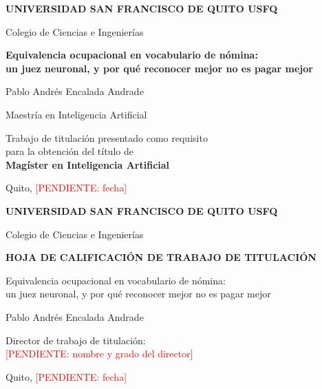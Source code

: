 \documentclass[12pt,a4paper,oneside]{report}
\newcommand{\pend}[1]{\textcolor{red}{\small[PENDIENTE: #1]}}
\newcommand{\elTitulo}{Equivalencia ocupacional en vocabulario de nómina:\\
  un juez neuronal, y por qué reconocer mejor no es pagar mejor}
\newcommand{\elAutor}{Pablo Andrés Encalada Andrade}
\newcommand{\elPrograma}{Maestría en Inteligencia Artificial}
\newcommand{\elColegio}{Colegio de Ciencias e Ingenierías}
\newcommand{\elDirector}{\pend{nombre y grado del director}}
\newcommand{\laFecha}{Quito, \pend{fecha}}
\begin{document}

\begin{titlepage}
\centering
{\large\bfseries UNIVERSIDAD SAN FRANCISCO DE QUITO USFQ\par}
\vspace{0.6cm}
{\large \elColegio\par}
\vspace{2.2cm}
{\LARGE\bfseries \elTitulo\par}
\vspace{2.2cm}
{\large \elAutor\par}
\vspace{0.6cm}
{\large \elPrograma\par}
\vfill
{Trabajo de titulación presentado como requisito\\
para la obtención del título de\\[0.4cm]
\textbf{Magíster en Inteligencia Artificial}\par}
\vspace{1.5cm}
{\laFecha\par}
\end{titlepage}

\thispagestyle{empty}
\begin{center}
{\large\bfseries UNIVERSIDAD SAN FRANCISCO DE QUITO USFQ\par}
\vspace{0.4cm}
{\large \elColegio\par}
\vspace{1.6cm}
{\large\bfseries HOJA DE CALIFICACIÓN DE TRABAJO DE TITULACIÓN\par}
\vspace{1.6cm}
{\large \elTitulo\par}
\vspace{1.6cm}
{\large \elAutor\par}
\vfill
\begin{flushleft}
Director de trabajo de titulación:\\[0.3cm]
\elDirector
\end{flushleft}
\vspace{1.2cm}
{\laFecha\par}
\end{center}
\clearpage
\end{document}
